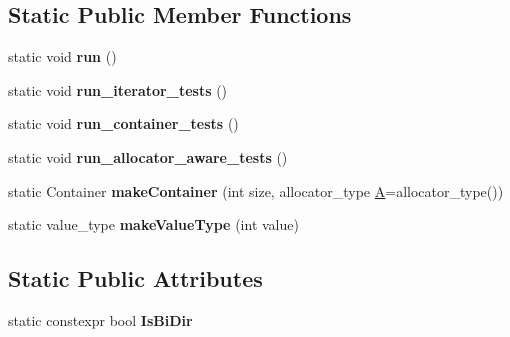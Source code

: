 \subsection*{Static Public Member Functions}
\begin{DoxyCompactItemize}
\item 
\mbox{\label{struct_iterator_debug_checks_1_1_basic_container_checks_a40e4fef05d632116234293ae74ac63a7}} 
static void {\bfseries run} ()
\item 
\mbox{\label{struct_iterator_debug_checks_1_1_basic_container_checks_a7455bf4c9721e6ad23c8bb0699e3e9c2}} 
static void {\bfseries run\+\_\+iterator\+\_\+tests} ()
\item 
\mbox{\label{struct_iterator_debug_checks_1_1_basic_container_checks_ab3182d56b804b3cd419eb874012b4e71}} 
static void {\bfseries run\+\_\+container\+\_\+tests} ()
\item 
\mbox{\label{struct_iterator_debug_checks_1_1_basic_container_checks_aea9be8d5c15995abf206e15817db8c9c}} 
static void {\bfseries run\+\_\+allocator\+\_\+aware\+\_\+tests} ()
\item 
\mbox{\label{struct_iterator_debug_checks_1_1_basic_container_checks_a9ab95e626297c28e7224832ba356cff5}} 
static Container {\bfseries make\+Container} (int size, allocator\+\_\+type \mbox{\hyperlink{struct_a}{A}}=allocator\+\_\+type())
\item 
\mbox{\label{struct_iterator_debug_checks_1_1_basic_container_checks_ab8930916fba29bd4a581498519ff3229}} 
static value\+\_\+type {\bfseries make\+Value\+Type} (int value)
\end{DoxyCompactItemize}
\subsection*{Static Public Attributes}
\begin{DoxyCompactItemize}
\item 
static constexpr bool {\bfseries Is\+Bi\+Dir}
\end{DoxyCompactItemize}



